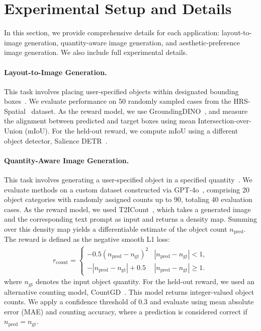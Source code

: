 \section{Experimental Setup and Details}
\label{sec:appx:exp setup and details}
In this section, we provide comprehensive details for each application: layout-to-image generation, quantity-aware image generation, and aesthetic-preference image generation. We also include full experimental details.
\paragraph{Layout-to-Image Generation.}
This task involves placing user-specified objects within designated bounding boxes~\cite{li2023gligen, xiao2023rnb, phung2023attnrefocusing, lee2024groundit}. We evaluate performance on 50 randomly sampled cases from the HRS-Spatial~\cite{Eslam2023hrs} dataset. As the reward model, we use GroundingDINO~\cite{liu2023grounding}, and measure the alignment between predicted and target boxes using mean Intersection-over-Union (mIoU). For the held-out reward, we compute mIoU using a different object detector, Salience DETR~\cite{Hou2024saliencedetr}. 
\vspace{-0.3cm}
\paragraph{Quantity-Aware Image Generation.}
This task involves generating a user-specified object in a specified quantity~\cite{kang2025counting,binyamin2024count, zafar2024iterativecountgeneration}. We evaluate methods on a custom dataset constructed via GPT-4o~\cite{openai2024gpt4ocard}, comprising 20 object categories with randomly assigned counts up to 90, totaling 40 evaluation cases.
As the reward model, we used T2ICount~\cite{qian2025t2icount}, which takes a generated image and the corresponding text prompt as input and returns a density map. Summing over this density map yields a differentiable estimate of the object count $n_{\text{pred}}$. The reward is defined as the negative smooth L1 loss:
\begin{align}
    \nonumber r_{\text{count}}=
    \begin{cases}
        -0.5(n_{\text{pred}} - n_{\text{gt}})^2 & |n_{\text{pred}}-n_{\text{gt}}| < 1, \\
        -|n_{\text{pred}} - n_{\text{gt}}| + 0.5 & |n_{\text{pred}}-n_{\text{gt}}| \ge 1.
    \end{cases}
\end{align}
where $n_{\text{gt}}$ denotes the input object quantity. For the held-out reward, we used an alternative counting model, CountGD~\cite{AminiNaieni2024countgd}.
This model returns integer-valued object counts. We apply a confidence threshold of 0.3 and evaluate using mean absolute error (MAE) and counting accuracy, where a prediction is considered correct if $n_{\text{pred}}=n_{\text{gt}}$. 
\vspace{-0.3cm}
